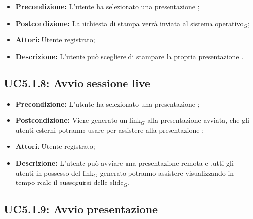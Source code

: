 \begin{itemize}
	\item \textbf{Precondizione:} L'utente ha selezionato una presentazione ;
	\item \textbf{Postcondizione:} La richiesta di stampa verrà inviata al sistema operativo$_G$;
	\item \textbf{Attori:} Utente registrato;
	\item \textbf{Descrizione:} L'utente può scegliere di stampare la propria presentazione .
\end{itemize}
\subsection{ UC5.1.8: Avvio sessione live}

\begin{itemize}
	\item \textbf{Precondizione:} L'utente ha selezionato una presentazione ;
	\item \textbf{Postcondizione:} Viene generato un link$_G$ alla presentazione avviata, che gli utenti esterni potranno usare per assistere alla presentazione ;
	\item \textbf{Attori:} Utente registrato;
	\item \textbf{Descrizione:} L'utente può avviare una presentazione remota e tutti gli utenti in possesso del link$_G$ generato potranno assistere visualizzando in tempo reale il susseguirsi delle slide$_G$.
\end{itemize}

\newpage
\subsection{ UC5.1.9: Avvio presentazione }


